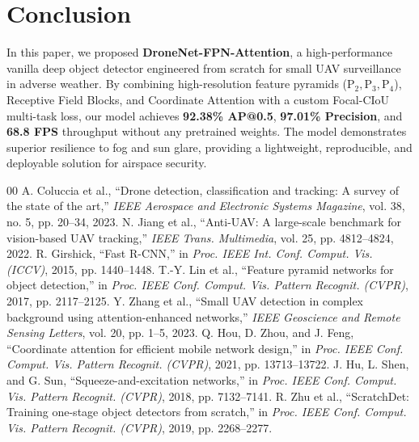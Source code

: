 \documentclass[10pt,conference,letterpaper,twocolumn]{article}
\begin{document}
\section{Conclusion}
In this paper, we proposed \textbf{DroneNet-FPN-Attention}, a high-performance vanilla deep object detector engineered from scratch for small UAV surveillance in adverse weather. By combining high-resolution feature pyramids ($\text{P}_2, \text{P}_3, \text{P}_4$), Receptive Field Blocks, and Coordinate Attention with a custom Focal-CIoU multi-task loss, our model achieves \textbf{92.38\% AP@0.5}, \textbf{97.01\% Precision}, and \textbf{68.8 FPS} throughput without any pretrained weights. The model demonstrates superior resilience to fog and sun glare, providing a lightweight, reproducible, and deployable solution for airspace security.

\begin{thebibliography}{00}
 A. Coluccia et al., ``Drone detection, classification and tracking: A survey of the state of the art,'' \textit{IEEE Aerospace and Electronic Systems Magazine}, vol. 38, no. 5, pp. 20--34, 2023.
 N. Jiang et al., ``Anti-UAV: A large-scale benchmark for vision-based UAV tracking,'' \textit{IEEE Trans. Multimedia}, vol. 25, pp. 4812--4824, 2022.
 R. Girshick, ``Fast R-CNN,'' in \textit{Proc. IEEE Int. Conf. Comput. Vis. (ICCV)}, 2015, pp. 1440--1448.
 T.-Y. Lin et al., ``Feature pyramid networks for object detection,'' in \textit{Proc. IEEE Conf. Comput. Vis. Pattern Recognit. (CVPR)}, 2017, pp. 2117--2125.
 Y. Zhang et al., ``Small UAV detection in complex background using attention-enhanced networks,'' \textit{IEEE Geoscience and Remote Sensing Letters}, vol. 20, pp. 1--5, 2023.
 Q. Hou, D. Zhou, and J. Feng, ``Coordinate attention for efficient mobile network design,'' in \textit{Proc. IEEE Conf. Comput. Vis. Pattern Recognit. (CVPR)}, 2021, pp. 13713--13722.
 J. Hu, L. Shen, and G. Sun, ``Squeeze-and-excitation networks,'' in \textit{Proc. IEEE Conf. Comput. Vis. Pattern Recognit. (CVPR)}, 2018, pp. 7132--7141.
 R. Zhu et al., ``ScratchDet: Training one-stage object detectors from scratch,'' in \textit{Proc. IEEE Conf. Comput. Vis. Pattern Recognit. (CVPR)}, 2019, pp. 2268--2277.
\end{thebibliography}
\end{document}
